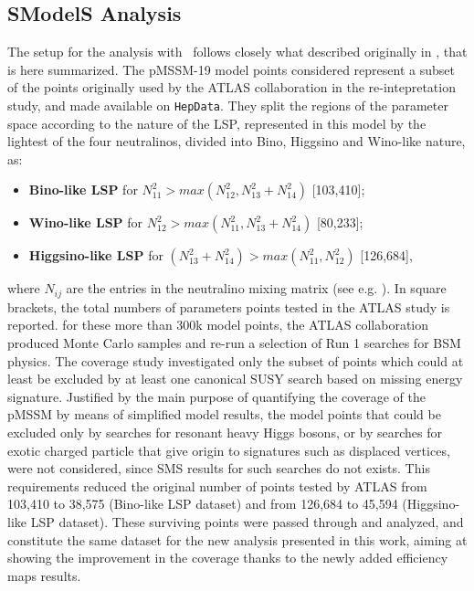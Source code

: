 \documentclass[epj,nopacs,fleqn]{svjour}
\begin{document}
\subsection{SModelS Analysis}
The setup for the analysis with \SMO~follows closely what described originally in \cite{Ambrogi:2017lov}, that is here summarized. The pMSSM-19 model points considered represent a subset of the points originally used by the ATLAS collaboration in the re-intepretation study\cite{Aad:2015baa}, and made available on \texttt{HepData}\cite{ATLASpMSSMhepdata}.
They split the regions of the parameter space according to the nature of the LSP, represented in this model by the lightest of the four neutralinos, divided into Bino, Higgsino and Wino-like nature, as:
\begin{itemize}
	\item \textbf{Bino-like LSP} for $N_{11}^2 > max(N^2_{12},N^2_{13} + N^2_{14})$ [103,410]; \
	\item \textbf{Wino-like LSP} for $N_{12}^2 > max(N^2_{11},N^2_{13} + N^2_{14})$ [80,233]; \
	\item \textbf{Higgsino-like LSP} for $(N_{13}^2 + N_{14}^2 )  > max(N^2_{11},N^2_{12})$ [126,684],\
\end{itemize}
where $N_{ij}$ are the entries in the neutralino mixing matrix (see e.g. \cite{Martin:1997ns}). In square brackets, the total numbers of parameters points tested in the ATLAS study is reported. for these more than 300k model points, the ATLAS collaboration produced Monte Carlo samples and re-run a selection of Run 1 searches for BSM physics. The \SMO coverage study investigated only the subset of points which could at least be excluded by at least one canonical SUSY search based on missing energy signature. Justified by the main purpose of quantifying the coverage of the pMSSM by means of simplified model results, the model points that could be excluded only by searches for resonant heavy Higgs bosons, or by searches for exotic charged particle that give origin to signatures such as displaced vertices, were not considered, since SMS results for such searches do not exists.
This requirements reduced the original number of points tested by ATLAS from 103,410 to 38,575 (Bino-like LSP dataset) and from 126,684 to 45,594 (Higgsino-like LSP dataset). These surviving points were passed through \SMO and analyzed, and constitute the same dataset for the new analysis presented in this work, aiming at showing the improvement in the coverage thanks to the newly added efficiency maps results. 
\\
\end{document}
